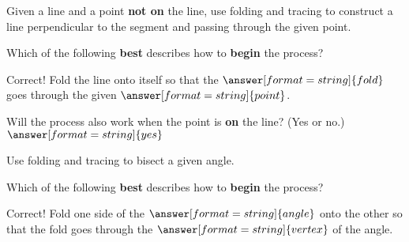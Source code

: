 \documentclass[nooutcomes]{ximera}
\begin{document}
\begin{problem}
Given a line and a point \textbf{not on} the line, use folding and tracing to construct a line perpendicular to the segment and passing through the given point. 
\begin{image}
\end{image}
Which of the following \textbf{best} describes how to \textbf{begin} the process?  
\begin{multipleChoice}
\end{multipleChoice}
\begin{problem}
Correct!  Fold the line onto itself so that the $\answer[format=string]{fold}$ goes through the given $\answer[format=string]{point}$.

Will the process also work when the point is \textbf{on} the line?  (Yes or no.) $\answer[format=string]{yes}$
\end{problem}
\end{problem}


\begin{problem}
Use folding and tracing to bisect a given angle.
\begin{image}
\end{image}
Which of the following \textbf{best} describes how to \textbf{begin} the process?  
\begin{multipleChoice}
\end{multipleChoice}
\begin{problem}
Correct!  Fold one side of the $\answer[format=string]{angle}$ onto the other so that the fold goes through the $\answer[format=string]{vertex}$ of the angle. 
\end{problem}
\end{problem}
\end{document}
